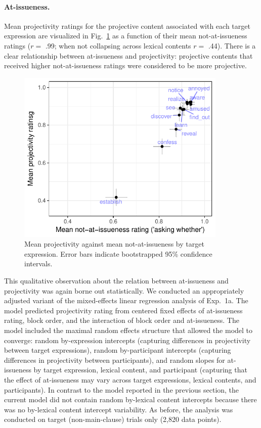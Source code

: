 \documentclass[11pt,fleqn]{article}
\newcommand{\6}{\mbox{$[\hspace*{-.6mm}[$}}
\newcommand{\9}{\mbox{$]\hspace*{-.6mm}]$}}
\newcommand{\figref}[1]{Fig.~\ref{#1}}
\begin{document}
\paragraph{At-issueness.} Mean projectivity ratings for the projective content associated with each target expression are visualized in \figref{fig:f-proj-ai-1b} as a function of their mean not-at-issueness ratings ($r =$ .99; when not collapsing across lexical contents $r =$ .44). There is a clear relationship between at-issueness and projectivity: projective contents that received higher not-at-issueness ratings were considered to be more projective.

\begin{figure}[!h]

\begin{center}
\includegraphics[width=10cm]{../results/exp1b/graphs/ai-proj-bytrigger-labels}
\end{center}

\caption{Mean projectivity against mean not-at-issueness by target expression. Error bars indicate bootstrapped 95\% confidence intervals.}
\label{fig:f-proj-ai-1b}
\end{figure}

This qualitative observation about the relation between at-issueness and projectivity was again borne out statistically. We conducted an appropriately adjusted variant of the mixed-effects linear regression analysis of Exp.~1a. The model predicted projectivity rating from centered fixed effects of at-issueness rating, block order, and the interaction of block order and at-issueness. The model included the maximal random effects structure that allowed the model to converge: random by-expression intercepts (capturing differences in projectivity between target expressions),  random by-participant intercepts (capturing differences in projectivity between participants), and random slopes for at-issueness by target expression, lexical content, and participant (capturing that the effect of at-issueness may vary across target expressions, lexical contents, and participants). In contrast to the model reported in the previous section, the current model did not contain random by-lexical content intercepts because there was no by-lexical content intercept variability. As before, the analysis was conducted on target (non-main-clause) trials only (2,820 data points).
\end{document}
